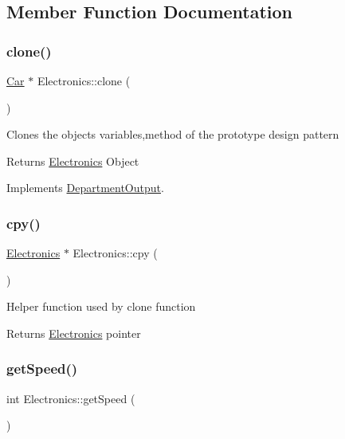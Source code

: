 \subsection{Member Function Documentation}
\mbox{\label{classElectronics_a292164aedff12771f4f05af648a9fc70}} 
\subsubsection{\texorpdfstring{clone()}{clone()}}
{\footnotesize\ttfamily \hyperlink{classCar}{Car} $\ast$ Electronics\+::clone (\begin{DoxyParamCaption}{ }\end{DoxyParamCaption})\hspace{0.3cm}{\ttfamily [virtual]}}

Clones the objects variables,method of the prototype design pattern \begin{DoxyReturn}{Returns}
\hyperlink{classElectronics}{Electronics} Object 
\end{DoxyReturn}


Implements \hyperlink{classDepartmentOutput_ab20c9d559bca6ce8e6748dfac47c3f84}{Department\+Output}.

\mbox{\label{classElectronics_a156b51c0a1a7f2850e33dbc6879b9c1e}} 
\subsubsection{\texorpdfstring{cpy()}{cpy()}}
{\footnotesize\ttfamily \hyperlink{classElectronics}{Electronics} $\ast$ Electronics\+::cpy (\begin{DoxyParamCaption}{ }\end{DoxyParamCaption})}

Helper function used by clone function \begin{DoxyReturn}{Returns}
\hyperlink{classElectronics}{Electronics} pointer 
\end{DoxyReturn}
\mbox{\label{classElectronics_a09912c940a0a8656d97f8597b766c0eb}} 
\subsubsection{\texorpdfstring{get\+Speed()}{getSpeed()}}
{\footnotesize\ttfamily int Electronics\+::get\+Speed (\begin{DoxyParamCaption}{ }\end{DoxyParamCaption})\hspace{0.3cm}{\ttfamily [virtual]}}

